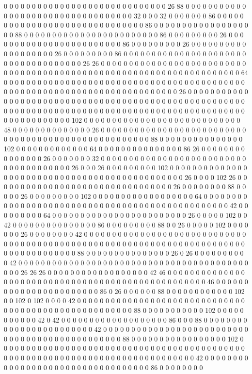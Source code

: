 0 0 0 0 0 0 0 0 0 0 0 0 0 0 0 0 0 0 0 0 0 0 0 0 0 0 0 0 0 26 88 0 0 0 0 0 0 0 0 0 0 0 0 0 0 0 0 0 0 0 0 0 0 0 0 0 0 0 0 0 0 0 0 0 0 32 0 0 0 32 0 0 0 0 0 0 0 86 0 0 0 0 0 0 0 0 0 0 0 0 0 0 0 0 0 0 0 0 0 0 0 0 0 0 0 0 0 0 86 0 0 0 0 0 0 0 0 0 0 0 0 0 0 0 0 0 0 0 88 0 0 0 0 0 0 0 0 0 0 0 0 0 0 0 0 0 0 0 0 0 0 0 0 86 0 0 0 0 0 0 0 0 0 26 0 0 0 0 0 0 0 0 0 0 0 0 0 0 0 0 0 0 0 0 0 0 0 0 86 0 0 0 0 0 0 0 0 0 26 0 0 0 0 0 0 0 0 0 0 0 0 0 0 0 0 0 0 0 26 0 0 0 0 0 0 0 0 0 86 0 0 0 0 0 0 0 0 0 0 0 0 0 0 0 0 0 0 0 0 0 0 0 0 0 0 0 0 0 0 0 0 0 0 0 0 26 26 0 0 0 0 0 0 0 0 0 0 0 0 0 0 0 0 0 0 0 0 0 0 0 0 0 0 0 0 0 0 0 0 0 0 0 0 0 0 0 0 0 0 0 0 0 0 0 0 0 0 0 0 0 0 0 0 0 0 0 0 0 0 0 0 0 0 0 0 64 0 0 0 0 0 0 0 0 0 0 0 0 0 0 0 0 0 0 0 0 0 0 0 0 0 0 0 0 0 0 0 0 0 0 0 0 0 0 0 0 0 0 0 0 0 0 0 0 0 0 0 0 0 0 0 0 0 0 0 0 0 0 0 0 0 0 0 0 0 0 0 0 0 0 26 0 0 0 0 0 0 0 0 0 0 0 0 0 0 0 0 0 0 0 0 0 0 0 0 0 0 0 0 0 0 0 0 0 0 0 0 0 0 0 0 0 0 0 0 0 0 0 0 0 0 0 0 0 0 0 0 0 0 0 0 0 0 0 0 0 0 0 0 0 0 0 0 0 0 0 0 0 0 0 0 0 0 0 0 0 0 0 0 0 0 0 0 0 0 0 0 0 0 0 0 0 0 0 0 0 0 0 0 0 102 0 0 0 0 0 0 0 0 0 0 0 0 0 0 0 0 0 0 0 0 0 0 0 0 0 0 0 0 48 0 0 0 0 0 0 0 0 0 0 0 0 0 0 26 0 0 0 0 0 0 0 0 0 0 0 0 0 0 0 0 0 0 0 0 0 0 0 0 0 0 0 0 0 0 0 0 0 0 0 0 0 0 0 0 0 0 0 0 0 0 0 0 0 0 0 0 88 0 0 0 0 0 0 0 0 0 0 0 0 0 0 0 102 0 0 0 0 0 0 0 0 0 0 0 0 0 64 0 0 0 0 0 0 0 0 0 0 0 0 0 0 0 86 26 0 0 0 0 0 0 0 0 0 0 0 0 0 0 0 26 0 0 0 0 0 0 0 32 0 0 0 0 0 0 0 0 0 0 0 0 0 0 0 0 0 0 0 0 0 0 0 0 0 0 0 0 0 0 0 0 0 0 0 0 0 0 26 0 0 0 26 0 0 0 0 0 0 0 0 0 102 0 0 0 0 0 0 0 0 0 0 0 0 0 0 0 0 0 0 0 0 0 0 0 0 0 0 0 0 0 0 0 0 0 0 0 0 0 0 0 0 0 0 0 0 0 0 26 0 0 0 0 102 26 0 0 0 0 0 0 0 0 0 0 0 0 0 0 0 0 0 0 0 0 0 0 0 0 0 0 0 0 0 0 0 0 26 0 0 0 0 0 0 0 0 88 0 0 0 0 0 26 0 0 0 0 0 0 0 0 0 102 0 0 0 0 0 0 0 0 0 0 0 0 0 0 0 0 0 0 64 0 0 0 0 0 0 0 0 0 0 0 0 0 0 0 0 0 0 0 0 0 0 0 0 0 0 0 0 0 0 0 0 0 0 0 0 0 0 0 0 0 0 0 0 0 0 0 0 42 0 0 0 0 0 0 0 0 0 64 0 0 0 0 0 0 0 0 0 0 0 0 0 0 0 0 0 0 0 0 0 0 0 0 26 0 0 0 0 0 102 0 0 42 0 0 0 0 0 0 0 0 0 0 0 0 0 0 0 86 0 0 0 0 0 0 0 0 0 88 0 0 26 0 0 0 0 0 102 0 0 0 0 0 0 0 26 0 0 0 0 0 0 0 0 42 0 0 0 0 0 0 0 0 0 0 0 0 0 0 0 0 0 0 0 0 0 0 0 0 0 0 0 0 0 0 0 0 0 0 0 0 0 0 0 0 0 0 0 0 0 0 0 0 0 0 0 0 0 0 0 0 0 0 0 0 0 0 0 0 0 0 0 0 0 0 0 0 0 0 0 0 0 0 0 0 0 0 0 0 0 88 0 0 0 0 0 0 0 0 0 0 0 0 0 0 0 26 0 26 0 0 0 0 0 0 0 0 0 0 42 0 0 0 0 0 0 0 0 0 0 0 0 0 0 0 0 0 0 0 0 0 0 0 0 0 0 0 0 0 0 0 0 0 0 0 0 0 0 0 0 0 0 0 0 26 26 26 0 0 0 0 0 0 0 0 0 0 0 0 0 0 0 0 0 0 42 46 0 0 0 0 0 0 0 0 0 0 0 0 0 0 0 0 0 0 0 0 0 0 0 0 0 0 0 0 0 0 0 0 0 0 0 0 0 0 0 0 0 0 0 0 0 0 0 0 0 0 46 0 0 0 0 0 0 0 0 0 0 0 0 0 0 0 0 0 0 0 0 0 0 0 86 0 26 0 0 0 0 0 0 88 0 0 0 0 0 0 0 0 0 0 0 0 102 0 0 102 0 102 0 0 0 0 42 0 0 0 0 0 0 0 0 0 0 0 0 0 0 0 0 0 0 0 0 0 0 0 0 0 0 0 0 0 0 0 0 0 0 0 0 0 0 0 0 0 0 0 0 0 0 0 0 0 0 0 0 0 88 0 0 0 0 0 0 0 0 0 0 0 102 0 0 0 0 0 0 0 0 0 0 0 42 0 42 0 0 0 0 0 0 0 0 0 0 0 0 0 0 0 0 0 0 0 86 0 0 0 88 0 0 0 0 0 0 0 0 0 0 0 0 0 0 0 0 0 0 0 0 0 0 0 0 42 0 0 0 0 0 0 0 0 0 0 0 0 0 0 0 0 0 0 0 0 0 0 0 0 0 0 0 0 0 0 0 0 0 0 0 0 0 0 0 0 0 0 0 0 0 0 0 88 0 0 0 0 0 0 0 0 0 0 0 0 0 0 0 0 0 102 0 0 0 0 0 0 0 0 0 0 0 0 0 0 0 0 0 0 0 0 0 0 0 0 0 0 0 0 0 0 0 0 0 0 0 0 0 0 0 0 0 0 0 0 0 0 0 0 0 0 0 0 0 0 0 0 0 0 0 0 0 0 0 0 0 0 0 0 0 0 0 0 0 0 0 0 0 0 42 0 0 0 0 0 0 0 0 0 0 0 0 0 0 0 0 0 0 0 0 0 0 0 0 0 0 0 0 0 0 0 0 0 0 86 0 0 0 0 0 0 0 0 